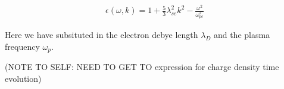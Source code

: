 	\begin{align}
	\epsilon(\omega, k) = 1 + \frac{5}{3} \lambda_{se}^2k ^2 -  \frac{\omega^2}{\omega_{pe}^2}
	\end{align}

	Here we have subsituted in the electron debye length \(\lambda_{D}\) and the plasma frequency \(\omega_{p}\).

	(NOTE TO SELF: NEED TO GET TO expression for charge density time evolution)







%
%
%
